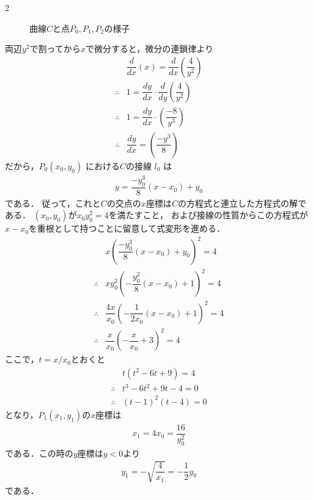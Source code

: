 \documentclass[../../main.tex]{subfiles}
\begin{document}
\begin{multicols}{2}
\begin{figure}[H]
    \caption{曲線$C$と点$P_0,P_1,P_2$の様子}
    \label{2007-1:fig:1}
  \end{figure}

  両辺$y^2$で割ってから$x$で微分すると，微分の連鎖律より
  \begin{align}
    & \dfrac{d}{dx}\left(x\right) = \dfrac{d}{dx}\left(\dfrac{4}{y^2}\right) \\
    \therefore
    & 1 = \dfrac{dy}{dx}\cdot \dfrac{d}{dy}\left(\dfrac{4}{y^2}\right)       \\
    \therefore
    & 1 = \dfrac{dy}{dx}\cdot \left(\dfrac{-8}{y^3}\right)                  \\
    \therefore
    & \dfrac{dy}{dx} =  \left(\dfrac{-y^3}{8}\right)
  \end{align}
  だから，$P_0(x_0, y_0)$ における$C$の接線 $l_0$ は
  \begin{align}
    y = \dfrac{-y^3_0}{8}\left(x-x_0\right) + y_0
  \end{align}
  である．
  従って，これと$C$の交点の$x$座標は$C$の方程式と連立した方程式の解である．
  $(x_0,y_0)$が$x_0y^2_0=4$を満たすこと，
  および接線の性質からこの方程式が$x-x_0$を重根として持つことに留意して式変形を進める．
  \begin{align}
    & x\left(\dfrac{-y^3_0}{8}\left(x-x_0\right) + y_0\right)^2 = 4           \\
    \therefore
    & xy^2_{0}\left(-\dfrac{y^2_0}{8}\left(x-x_0\right) + 1\right)^2 = 4      \\
    \therefore
    & \dfrac{4x}{x_0}\left(-\dfrac{1}{2x_0}\left(x-x_0\right) + 1\right)^2 = 4 \\
    \therefore
    & \dfrac{x}{x_0}\left(-\dfrac{x}{x_0}+ 3\right)^2 = 4
  \end{align}
  ここで，$t=x/x_0$とおくと
  \begin{align}
    & t(t^2-6t+9) = 4                      \\
    \therefore
    & t^3-6t^2+9t-4 = 0                    \\
    \therefore
    & (t-1)^2(t-4) = 0 \label{eq:1}
  \end{align}
  となり，$P_1(x_1,y_1)$の$x$座標は
  \begin{align}
    x_1 = 4x_0 = \dfrac{16}{y^2_0}  \label{eq:2}
  \end{align}
  である．この時の$y$座標は$y<0$より
  \begin{align}
    y_1 = -\sqrt{\dfrac{4}{x_1}} = -\dfrac{1}{2}y_0 \label{eq:3}
  \end{align}
  である．


\end{multicols}
\end{document}
